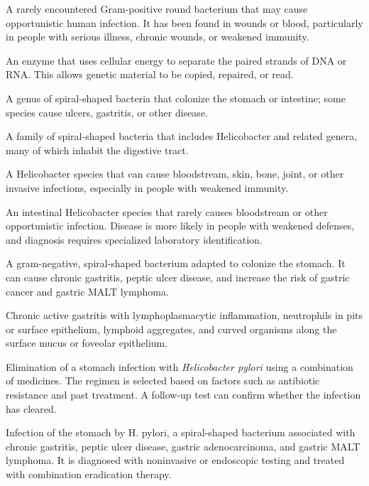  A rarely encountered Gram-positive round bacterium that may cause opportunistic human infection. It has been found in wounds or blood, particularly in people with serious illness, chronic wounds, or weakened immunity.

 An enzyme that uses cellular energy to separate the paired strands of DNA or RNA. This allows genetic material to be copied, repaired, or read.

 A genus of spiral-shaped bacteria that colonize the stomach or intestine; some species cause ulcers, gastritis, or other disease.

 A family of spiral-shaped bacteria that includes Helicobacter and related genera, many of which inhabit the digestive tract.

 A Helicobacter species that can cause bloodstream, skin, bone, joint, or other invasive infections, especially in people with weakened immunity.

 An intestinal Helicobacter species that rarely causes bloodstream or other opportunistic infection. Disease is more likely in people with weakened defenses, and diagnosis requires specialized laboratory identification.

 A gram-negative, spiral-shaped bacterium adapted to colonize the stomach. It can cause chronic
gastritis, peptic ulcer disease, and increase the risk of gastric cancer and gastric MALT
lymphoma.

 Chronic active gastritis with lymphoplasmacytic inflammation, neutrophils in pits or surface epithelium, lymphoid aggregates, and curved organisms along the surface mucus or foveolar epithelium.

 Elimination of a stomach infection with \textit{Helicobacter pylori} using a combination of medicines. The regimen is selected based on factors such as antibiotic resistance and past treatment. A follow-up test can confirm whether the infection has cleared.

 Infection of the stomach by H. pylori, a spiral-shaped bacterium associated with chronic
gastritis, peptic ulcer disease, gastric adenocarcinoma, and gastric MALT lymphoma. It
is diagnosed with noninvasive or endoscopic testing and treated with combination
eradication therapy.

